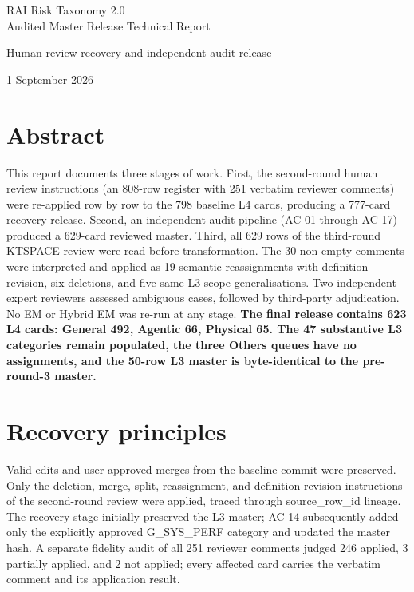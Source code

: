 \documentclass[11pt,a4paper]{article}
\begin{document}
\begin{titlepage}
\thispagestyle{empty}
\vspace*{42mm}
\begin{center}
{\LARGE RAI Risk Taxonomy 2.0\\[3pt]Audited Master Release Technical Report}\par
\vspace{9mm}
{\large Human-review recovery and independent audit release}\par
\vspace{6mm}
{\large 1 September 2026}\par
\vspace{9mm}
\end{center}
\end{titlepage}
\par\section*{Abstract}
This report documents three stages of work. First, the second-round human review instructions (an 808-row register with 251 verbatim reviewer comments) were re-applied row by row to the 798 baseline L4 cards, producing a 777-card recovery release. Second, an independent audit pipeline (AC-01 through AC-17) produced a 629-card reviewed master. Third, all 629 rows of the third-round KTSPACE review were read before transformation. The 30 non-empty comments were interpreted and applied as 19 semantic reassignments with definition revision, six deletions, and five same-L3 scope generalisations. Two independent expert reviewers assessed ambiguous cases, followed by third-party adjudication. No EM or Hybrid EM was re-run at any stage. \textbf{The final release contains 623 L4 cards: General 492, Agentic 66, Physical 65. The 47 substantive L3 categories remain populated, the three Others queues have no assignments, and the 50-row L3 master is byte-identical to the pre-round-3 master.}
\par\section{Recovery principles}
Valid edits and user-approved merges from the baseline commit were preserved. Only the deletion, merge, split, reassignment, and definition-revision instructions of the second-round review were applied, traced through source\_row\_id lineage. The recovery stage initially preserved the L3 master; AC-14 subsequently added only the explicitly approved G\_SYS\_PERF category and updated the master hash. A separate fidelity audit of all 251 reviewer comments judged 246 applied, 3 partially applied, and 2 not applied; every affected card carries the verbatim comment and its application result.
\end{document}
